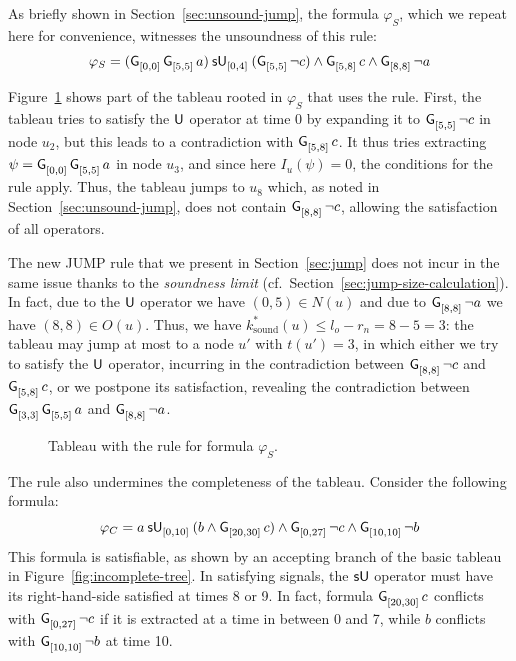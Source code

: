 \documentclass{easychair}
\begin{document}
As briefly shown in Section~\ref{sec:unsound-jump}, the formula $\varphi_S$, which we repeat here for convenience, witnesses the unsoundness of this rule:
\[
\varphi_S =
\suntil{[0,4]}{(\glob{[0,0]} \glob{[5,5]} a)}{(\glob{[5,5]} \neg c)} \land \glob{[5,8]} c \land \glob{[8,8]} \neg a
\]

Figure~\ref{fig:unsound-tree} shows part of the tableau rooted in $\varphi_S$ that uses the \oldjump{} rule.
First, the tableau tries to satisfy the $\untilop$ operator at time 0 by expanding it to $\glob{[5,5]} \neg c$ in node $u_2$, but this leads to a contradiction with $\glob{[5,8]} c$.
It thus tries extracting $\psi = \glob{[0,0]} \glob{[5,5]} a$ in node $u_3$, and since here $I_u(\psi) = 0$, the conditions for the \oldjump{} rule apply.
Thus, the tableau jumps to $u_8$ which, as noted in Section~\ref{sec:unsound-jump}, does not contain $\glob{[8,8]} \neg c$, allowing the satisfaction of all operators.

The new \textsf{JUMP} rule that we present in Section~\ref{sec:jump} does not incur in the same issue thanks to the \emph{soundness limit} (cf.\ Section~\ref{sec:jump-size-calculation}).
In fact, due to the $\untilop$ operator we have $(0,5) \in N(u)$ and due to $\glob{[8,8]} \neg a$ we have $(8,8) \in O(u)$.
Thus, we have $k^{\ast}_{\text{sound}}(u) \leq l_o - r_n = 8 - 5 = 3$:
the tableau may jump at most to a node $u'$ with $t(u') = 3$,
in which either we try to satisfy the $\untilop$ operator, incurring in the contradiction between $\glob{[8,8]} \neg c$ and $\glob{[5,8]} c$,
or we postpone its satisfaction, revealing the contradiction between $\glob{[3,3]} \glob{[5,5]} a$ and $\glob{[8,8]} \neg a$.

\begin{figure}
\centering

\caption{Tableau with the \oldjump{} rule for formula $\varphi_S$.}
\label{fig:unsound-tree}
\end{figure}


The \oldjump{} rule also undermines the completeness of the tableau.
Consider the following formula:
\[
\varphi_C =
\suntil{[0, 10]}{a}{(b \land \glob{[20, 30]} c)} \land \glob{[0, 27]} \neg c \land \glob{[10, 10]} \neg b
\]
This formula is satisfiable, as shown by an accepting branch of the basic tableau in Figure~\ref{fig:incomplete-tree}.
In satisfying signals, the $\suntilop$ operator must have its right-hand-side satisfied at times 8 or 9.
In fact, formula $\glob{[20, 30]} c$ conflicts with $\glob{[0, 27]} \neg c$ if it is extracted at a time in between 0 and 7, while $b$ conflicts with $\glob{[10, 10]} \neg b$ at time 10.
\end{document}
